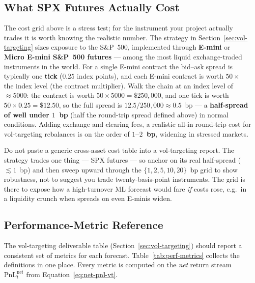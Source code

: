 \subsection{What SPX Futures Actually Cost}
\label{subsec:spx-costs}

The cost grid above is a stress test; for the instrument your project actually trades it is worth knowing the realistic number. The strategy in Section~\ref{sec:vol-targeting} sizes exposure to the S\&P~500, implemented through \textbf{E-mini} or \textbf{Micro E-mini S\&P~500 futures} --- among the most liquid exchange-traded instruments in the world. For a single E-mini contract the bid--ask spread is typically one \textbf{tick} ($0.25$ index points), and each E-mini contract is worth $50 \times$ the index level (the contract multiplier). Walk the chain at an index level of $\approx 5000$: the contract is worth $50 \times 5000 = \$250{,}000$, and one tick is worth $50 \times 0.25 = \$12.50$, so the full spread is $12.5 / 250{,}000 \approx 0.5$~bp --- a \textbf{half-spread of well under $1$~bp} (half the round-trip spread defined above) in normal conditions. Adding exchange and clearing fees, a realistic all-in round-trip cost for vol-targeting rebalances is on the order of \textbf{$1$--$2$~bp}, widening in stressed markets.

\begin{warning}
Do not paste a generic cross-asset cost table into a vol-targeting report. The strategy trades one thing --- SPX futures --- so anchor on its real half-spread ($\lesssim 1$~bp) and then sweep upward through the $\{1,2,5,10,20\}$~bp grid to show robustness, not to suggest you trade twenty-basis-point instruments. The grid is there to expose how a high-turnover ML forecast would fare \emph{if} costs rose, e.g.\ in a liquidity crunch when spreads on even E-minis widen.
\end{warning}

\subsection{Performance-Metric Reference}
\label{subsec:metric-reference}

The vol-targeting deliverable table (Section~\ref{sec:vol-targeting}) should report a consistent set of metrics for each forecast. Table~\ref{tab:perf-metrics} collects the definitions in one place. Every metric is computed on the \emph{net} return stream $\text{PnL}_t^{\text{net}}$ from Equation~\eqref{eq:net-pnl-vt}.

